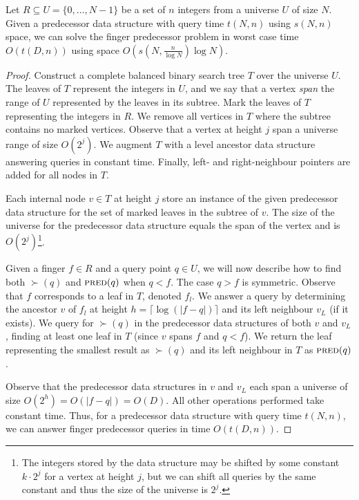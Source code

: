 \begin{lemma}\label{lem:fingerpred}
	Let $R \subseteq U = \{ 0, \ldots, N-1 \}$ be a set of $n$ integers from a universe $U$ of size $N$. 
	Given a predecessor data structure with query time $t(N, n)$ using $s(N, n)$ space,
	we can solve the finger predecessor problem in worst case time $O(t(D, n))$ using space $O(s(N, \frac{n}{\log N}) \log N)$.
\end{lemma}
\begin{proof}
Construct a complete balanced binary search tree $T$ over the universe $U$. The leaves of $T$ represent the integers in $U$, and we say that a vertex \emph{span} the range of $U$ represented by the leaves in its subtree. Mark the leaves of $T$ representing the integers in $R$. We remove all vertices in $T$ where the subtree contains no marked vertices. Observe that a vertex at height $j$ span a universe range of size $O(2^j)$. We augment $T$ with a level ancestor data structure answering queries in constant time. Finally, left- and right-neighbour pointers are added for all nodes in $T$.

Each internal node $v \in T$ at height $j$ store an instance of the given predecessor data structure for the set of marked leaves in the subtree of $v$. The size of the universe for the predecessor data structure equals the span of the vertex and is $O(2^j)$\footnote{The integers stored by the data structure may be shifted by some constant $k \cdot 2^j$ for a vertex at height $j$, but we can shift all queries by the same constant and thus the size of the universe is $2^j$.}.

Given a finger $f \in R$ and a query point $q \in U$, we will now describe how to find both $\succ(q)$ and $\textsc{pred}(q)$ when $q < f$. The case $q > f$ is symmetric. 
Observe that $f$ corresponds to a leaf in $T$, denoted $f_l$. We answer a query by determining the ancestor $v$ of $f_l$ at height $h = \lceil \log(|f - q|) \rceil$ and its left neighbour $v_L$ (if it exists). We query for $\succ(q)$ in the predecessor data structures of both $v$ and $v_L$, finding at least one leaf in $T$ (since $v$ spans $f$ and $q < f$). We return the leaf representing the smallest result as $\succ(q)$ and its left neighbour in $T$ as $\textsc{pred}(q)$.

Observe that the predecessor data structures in $v$ and $v_L$ each span a universe of size $O(2^h) = O(|f-q|) = O(D)$. All other operations performed take constant time. Thus, for a predecessor data structure with query time $t(N,n)$, we can answer finger predecessor queries in time $O(t(D, n))$.


\end{proof}
